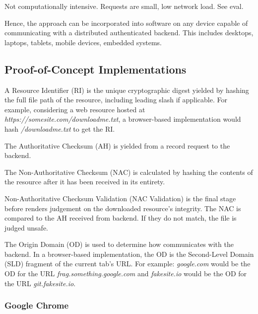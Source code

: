 Not computationally intensive. Requests are small, low network load. See eval.

Hence, the approach can be incorporated into software on any device capable of
communicating with a distributed authenticated backend. This includes desktops,
laptops, tablets, mobile devices, embedded systems.

\subsection{Proof-of-Concept Implementations}


A Resource Identifier (RI) is the unique cryptographic digest yielded by hashing
the full file path of the resource, including leading slash if applicable. For
example, considering a web resource hosted at
\textit{https://somesite.com/downloadme.txt}, a browser-based \SYSTEM{}
implementation would hash \textit{/downloadme.txt} to get the RI.

The Authoritative Checksum (AH) is yielded from a record request to the backend.

The Non-Authoritative Checksum (NAC) is calculated by hashing the contents of the
resource after it has been received in its entirety.

Non-Authoritative Checksum Validation (NAC Validation) is the final stage before
\SYSTEM{} renders judgement on the downloaded resource's integrity. The NAC is
compared to the AH received from backend. If they do not match, the file is
judged unsafe.

The Origin Domain (OD) is used to determine how \SYSTEM{} communicates with the
backend. In a browser-based implementation, the OD is the Second-Level Domain
(SLD) fragment of the current tab's URL. For example:
\emph{google.com} would be the OD for the URL \emph{frag.something.google.com}
and \emph{fakesite.io} would be the OD for the URL \emph{git.fakesite.io}.

\subsubsection{Google Chrome}


